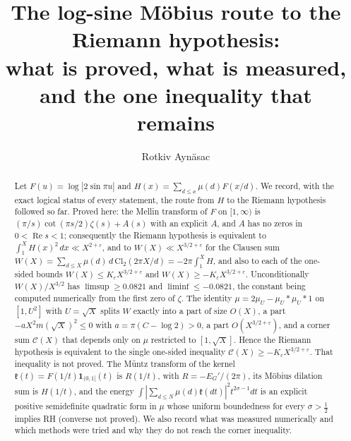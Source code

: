 \documentclass[11pt,reqno]{amsart}
\numberwithin{equation}{section}
\theoremstyle{plain}
\theoremstyle{definition}
\theoremstyle{remark}
\begin{document}
\title[The log-sine M\"obius route]{The log-sine M\"obius route to the Riemann hypothesis:\\ what is proved, what is measured, and the one inequality that remains}
\author{Rotkiv Ayn\"asac}
\date{}

\begin{abstract}
Let $F(u)=\log|2\sin\pi u|$ and $H(x)=\sum_{d\le x}\mu(d)F(x/d)$. We record, with the exact logical status of every statement, the route from $H$ to the Riemann hypothesis followed so far. Proved here: the Mellin transform of $F$ on $[1,\infty)$ is $(\pi/s)\cot(\pi s/2)\zeta(s)+A(s)$ with an explicit $A$, and $A$ has no zeros in $0<\operatorname{Re}s<1$; consequently the Riemann hypothesis is equivalent to $\int_1^XH(x)^2\,dx\ll X^{2+\varepsilon}$, and to $W(X)\ll X^{3/2+\varepsilon}$ for the Clausen sum $W(X)=\sum_{d\le X}\mu(d)\,d\,\mathrm{Cl}_2(2\pi X/d)=-2\pi\int_1^XH$, and also to each of the one-sided bounds $W(X)\le K_\varepsilon X^{3/2+\varepsilon}$ and $W(X)\ge-K_\varepsilon X^{3/2+\varepsilon}$. Unconditionally $W(X)/X^{3/2}$ has $\limsup\ge0.0821$ and $\liminf\le-0.0821$, the constant being computed numerically from the first zero of $\zeta$. The identity $\mu=2\mu_U-\mu_U*\mu_U*1$ on $[1,U^2]$ with $U=\sqrt X$ splits $W$ exactly into a part of size $O(X)$, a part $-aX^2m(\sqrt X)^2\le0$ with $a=\pi(C-\log2)>0$, a part $O(X^{3/2+\varepsilon})$, and a corner sum $\mathcal C(X)$ that depends only on $\mu$ restricted to $[1,\sqrt X]$. Hence the Riemann hypothesis is equivalent to the single one-sided inequality $\mathcal C(X)\ge-K_\varepsilon X^{3/2+\varepsilon}$. That inequality is not proved. The M\"untz transform of the kernel $\mathfrak k(t)=F(1/t)\mathbf 1_{(0,1]}(t)$ is $R(1/t)$, with $R=-E_G'/(2\pi)$, its M\"obius dilation sum is $H(1/t)$, and the energy $\int|\sum_{d\le N}\mu(d)\mathfrak k(dt)|^2t^{2\sigma-1}dt$ is an explicit positive semidefinite quadratic form in $\mu$ whose uniform boundedness for every $\sigma>\frac12$ implies RH (converse not proved). We also record what was measured numerically and which methods were tried and why they do not reach the corner inequality.
\end{abstract}


\maketitle
\tableofcontents
\end{document}
